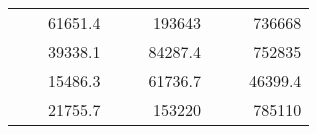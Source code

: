 \begin{table}[H]
\begin{tabular}{|ccrccrccc}
\rowcolor[HTML]{DDFDFF} 
\multicolumn{1}{|c|}{\cellcolor[HTML]{FFFFC7}}                                & \multicolumn{1}{c|}{\cellcolor[HTML]{DDFDFF}}                      & \multicolumn{1}{r|}{\cellcolor[HTML]{DAE8FC}61651.4}   & \multicolumn{1}{c|}{\cellcolor[HTML]{FFFFC7}}                                & \multicolumn{1}{c|}{\cellcolor[HTML]{DDFDFF}}                       & \multicolumn{1}{r|}{\cellcolor[HTML]{DDFDFF}193643}    & \multicolumn{1}{c|}{\cellcolor[HTML]{FFFFC7}}                                & \multicolumn{1}{c|}{\cellcolor[HTML]{DDFDFF}}                      & \multicolumn{1}{r|}{\cellcolor[HTML]{DDFDFF}736668}    \\ \cline{3-3} \cline{6-6} \cline{9-9} 
\multicolumn{1}{|c|}{\cellcolor[HTML]{FFFFC7}}                                & \multicolumn{1}{c|}{\cellcolor[HTML]{DDFDFF}}                      & \multicolumn{1}{r|}{\cellcolor[HTML]{DDFDFF}39338.1}   & \multicolumn{1}{c|}{\cellcolor[HTML]{FFFFC7}}                                & \multicolumn{1}{c|}{\cellcolor[HTML]{DDFDFF}}                       & \multicolumn{1}{r|}{\cellcolor[HTML]{DAE8FC}84287.4}   & \multicolumn{1}{c|}{\cellcolor[HTML]{FFFFC7}}                                & \multicolumn{1}{c|}{\cellcolor[HTML]{DDFDFF}}                      & \multicolumn{1}{r|}{\cellcolor[HTML]{DAE8FC}752835}    \\ \cline{3-3} \cline{6-6} \cline{9-9} 
\rowcolor[HTML]{DDFDFF} 
\multicolumn{1}{|c|}{\cellcolor[HTML]{FFFFC7}}                                & \multicolumn{1}{c|}{\cellcolor[HTML]{DDFDFF}}                      & \multicolumn{1}{r|}{\cellcolor[HTML]{DAE8FC}15486.3}   & \multicolumn{1}{c|}{\cellcolor[HTML]{FFFFC7}}                                & \multicolumn{1}{c|}{\cellcolor[HTML]{DDFDFF}}                       & \multicolumn{1}{r|}{\cellcolor[HTML]{DDFDFF}61736.7}   & \multicolumn{1}{c|}{\cellcolor[HTML]{FFFFC7}}                                & \multicolumn{1}{c|}{\cellcolor[HTML]{DDFDFF}}                      & \multicolumn{1}{r|}{\cellcolor[HTML]{DDFDFF}46399.4}   \\ \cline{3-3} \cline{6-6} \cline{9-9} 
\multicolumn{1}{|c|}{\cellcolor[HTML]{FFFFC7}}                                & \multicolumn{1}{c|}{\cellcolor[HTML]{DDFDFF}}                      & \multicolumn{1}{r|}{\cellcolor[HTML]{DDFDFF}21755.7}   & \multicolumn{1}{c|}{\cellcolor[HTML]{FFFFC7}}                                & \multicolumn{1}{c|}{\cellcolor[HTML]{DDFDFF}}                       & \multicolumn{1}{r|}{\cellcolor[HTML]{DAE8FC}153220}    & \multicolumn{1}{c|}{\cellcolor[HTML]{FFFFC7}}                                & \multicolumn{1}{c|}{\cellcolor[HTML]{DDFDFF}}                      & \multicolumn{1}{r|}{\cellcolor[HTML]{DAE8FC}785110}    \\ \cline{3-3} \cline{6-6} \cline{9-9} 

\end{tabular}
\end{table}
